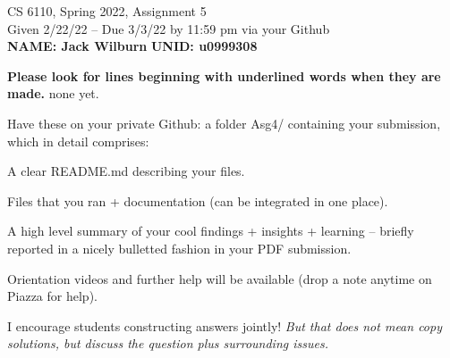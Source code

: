 \documentclass[11pt]{article}
\begin{document}

\newlength{\minpagw}
\settowidth{\minpagw}{\hspace{40em}}

\begin{center}
\begin{large}
  CS 6110, Spring 2022, Assignment 5  \\
  Given 2/22/22 -- Due 3/3/22 by 11:59 pm via your Github 
  \ \\
    {  {\Large\bf NAME: Jack Wilburn} \hfill {\Large\bf UNID: u0999308}\hspace{4cm} }
          \ \\
\end{large}

\end{center}

 {\bf Please look for lines beginning with underlined words when they are made.}
         {\tiny none yet.}

         Have these on your private Github:
         a folder Asg4/ containing your submission, which in detail comprises:
         \begin{compactitem}
         \item A clear README.md describing your files.
         \item Files that you ran + documentation (can be integrated in one place).
         \item A high level summary of your cool findings + insights + learning -- briefly reported in
           a nicely bulletted fashion in your PDF submission.
         \end{compactitem}

Orientation videos and further help will be available (drop a note anytime
on Piazza for help).

I encourage students constructing answers jointly! {\em But that does not
mean copy solutions, but discuss the question plus surrounding issues.}
\end{document}
